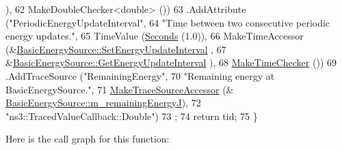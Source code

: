 \begin{DoxyCode}
      ),
62                    MakeDoubleChecker<double> ())
63     .AddAttribute (\textcolor{stringliteral}{"PeriodicEnergyUpdateInterval"},
64                    \textcolor{stringliteral}{"Time between two consecutive periodic energy updates."},
65                    TimeValue (\hyperlink{group__timecivil_ga33c34b816f8ff6628e33d5c8e9713b9e}{Seconds} (1.0)),
66                    MakeTimeAccessor (&\hyperlink{classns3_1_1BasicEnergySource_a077f464384ffcb26db5964a8962d5fb2}{BasicEnergySource::SetEnergyUpdateInterval}
      ,
67                                      &\hyperlink{classns3_1_1BasicEnergySource_a79566e2cb8a0e9a7f41fdeab71b8ff9c}{BasicEnergySource::GetEnergyUpdateInterval}
      ),
68                    \hyperlink{group__time_ga7032965bd4afa578691d88c09e4481c1}{MakeTimeChecker} ())
69     .AddTraceSource (\textcolor{stringliteral}{"RemainingEnergy"},
70                      \textcolor{stringliteral}{"Remaining energy at BasicEnergySource."},
71                      \hyperlink{group__tracing_gab21a770b9855af4e8f69f7531ea4a6b0}{MakeTraceSourceAccessor} (&
      \hyperlink{classns3_1_1BasicEnergySource_abf17a7a388b23d98fa67944a25d55c40}{BasicEnergySource::m\_remainingEnergyJ}),
72                      \textcolor{stringliteral}{"ns3::TracedValueCallback::Double"})
73   ;
74   \textcolor{keywordflow}{return} tid;
75 \}
\end{DoxyCode}


Here is the call graph for this function\+:


